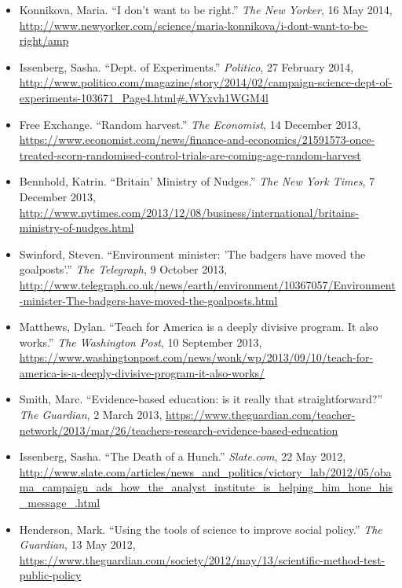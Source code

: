 \documentclass[12pt,a4paper]{article}
\begin{document}
\begin{itemize}
\item Konnikova, Maria. ``I don't want to be right.'' \textit{The New Yorker}, 16 May 2014, \url{http://www.newyorker.com/science/maria-konnikova/i-dont-want-to-be-right/amp}
\item Issenberg, Sasha. ``Dept. of Experiments.'' \textit{Politico}, 27 February 2014, \url{http://www.politico.com/magazine/story/2014/02/campaign-science-dept-of-experiments-103671_Page4.html#.WYxvh1WGM4l}

\item Free Exchange. ``Random harvest.'' \textit{The Economist}, 14 December 2013, \url{https://www.economist.com/news/finance-and-economics/21591573-once-treated-scorn-randomised-control-trials-are-coming-age-random-harvest}

\item Bennhold, Katrin. ``Britain' Ministry of Nudges.'' \textit{The New York Times}, 7 December 2013, \url{http://www.nytimes.com/2013/12/08/business/international/britains-ministry-of-nudges.html}

\item Swinford, Steven. ``Environment minister: 'The badgers have moved the goalposts'.'' \textit{The Telegraph}, 9 October 2013, \url{http://www.telegraph.co.uk/news/earth/environment/10367057/Environment-minister-The-badgers-have-moved-the-goalposts.html}

\item Matthews, Dylan. ``Teach for America is a deeply divisive program. It also works.'' \textit{The Washington Post}, 10 September 2013, \url{https://www.washingtonpost.com/news/wonk/wp/2013/09/10/teach-for-america-is-a-deeply-divisive-program-it-also-works/}

\item Smith, Marc. ``Evidence-based education: is it really that straightforward?'' \textit{The Guardian}, 2 March 2013, \url{https://www.theguardian.com/teacher-network/2013/mar/26/teachers-research-evidence-based-education}

\item Issenberg, Sasha. ``The Death of a Hunch.'' \textit{Slate.com}, 22 May 2012,  \url{http://www.slate.com/articles/news_and_politics/victory_lab/2012/05/obama_campaign_ads_how_the_analyst_institute_is_helping_him_hone_his_message_.html}

\item Henderson, Mark. ``Using the tools of science to improve social policy.'' \textit{The Guardian}, 13 May 2012, \url{https://www.theguardian.com/society/2012/may/13/scientific-method-test-public-policy}


\end{itemize}
\end{document}
